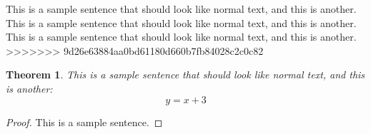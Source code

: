 \documentclass[officiallayout]{tktla}
\newtheorem{theorem}{Theorem}[section]
\begin{document}
This is a sample sentence that should look like normal text, and this
is another. This is a sample sentence that should look like normal
text, and this is another. This is a sample sentence that should look
like normal text, and this is another.
>>>>>>> 9d26e63884aa0bd61180d660b7fb84028c2c0c82


\begin{theorem}
This is a sample sentence that should look like normal text,
and this is another:
\[ y = x+3 \]
\end{theorem}

\begin{proof}
This is a sample sentence.
\end{proof}



\end{document}
